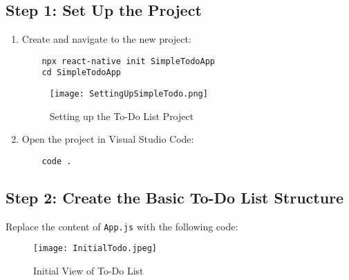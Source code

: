 \documentclass{article}
\begin{document}
\subsection{Step 1: Set Up the Project}
\begin{enumerate}
    \item Create and navigate to the new project:
    \begin{verbatim}
    npx react-native init SimpleTodoApp
    cd SimpleTodoApp
    \end{verbatim}
    \begin{figure}[H]
        \centering
        \texttt{[image: SettingUpSimpleTodo.png]}
        \caption{Setting up the To-Do List Project}
    \end{figure}
    
    \item Open the project in Visual Studio Code:
    \begin{verbatim}
    code .
    \end{verbatim}
\end{enumerate}

\subsection{Step 2: Create the Basic To-Do List Structure}
Replace the content of \texttt{App.js} with the following code:
\begin{figure}[H]
    \centering
    \texttt{[image: InitialTodo.jpeg]}
    \caption{Initial View of To-Do List}
\end{figure}
\end{document}
